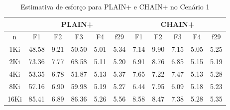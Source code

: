 \begin{table}[ht]
    \tiny
    \centering
    \caption{Estimativa de esforço para PLAIN+ e CHAIN+ no Cenário 1}\label{both-plus-effort}
    \begin{tabular}{c|ccccc|ccccc}
        \toprule
        & \multicolumn{5}{c}{PLAIN+} & \multicolumn{5}{c}{CHAIN+} \\
        \midrule
        n    & F1    & F2    & F3    & F4   & f29   & F1    & F2    & F3    & F4   & f29  \\\midrule
        1Ki  & 48.58 & 9.21  & 50.50 & 5.01 & 5.34  & 7.14  & 9.90  & 7.15  & 5.05 & 5.25 \\\midrule
        2Ki  & 73.36 & 7.77  & 68.58 & 5.11 & 5.20  & 6.91  & 8.76  & 6.85  & 5.15 & 5.19 \\\midrule
        4Ki  & 53.35 & 6.78  & 51.87 & 5.13 & 5.37  & 7.65  & 7.22  & 7.47  & 5.13 & 5.28 \\\midrule
        8Ki  & 57.16 & 6.90  & 59.98 & 5.19 & 5.27  & 6.44  & 7.95  & 6.09  & 5.18 & 5.23 \\\midrule
        16Ki & 85.41 & 6.89  & 86.36 & 5.26 & 5.56  & 8.58  & 8.47  & 7.38  & 5.28 & 5.35 \\
        \bottomrule
    \end{tabular}
\end{table}
